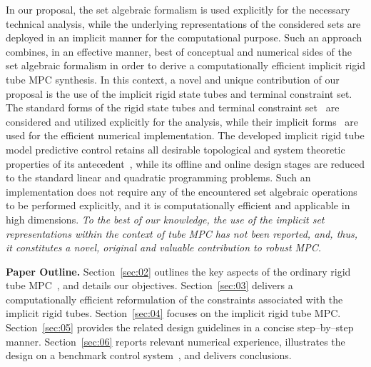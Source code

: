 \documentclass[twocolumn]{autart}
\numberwithin{equation}{section}
\begin{document}
In our proposal, the set algebraic formalism is used explicitly for the necessary technical analysis, while the underlying representations of the considered sets are deployed in an implicit manner for the computational purpose. Such an approach combines, in an effective manner, best of conceptual and  numerical sides of the set algebraic formalism in order to derive a computationally efficient implicit rigid tube MPC synthesis.   In this context, a novel and unique contribution of our proposal is the use of the implicit rigid state tubes and terminal constraint set. The standard forms of the rigid state tubes and terminal constraint set~\cite{mayne:seron:rakovic:2005} are considered and utilized explicitly for the analysis, while their implicit forms~\cite{rakovic:2022,rakovic:zhang:2023:a,rakovic:zhang:2023:b} are used for the efficient numerical implementation.   The developed implicit rigid tube model predictive control retains all desirable topological and system theoretic properties of its antecedent~\cite{mayne:seron:rakovic:2005}, while its offline and online design stages are  reduced to the standard linear and quadratic programming problems. Such an implementation does not require any of the encountered set algebraic operations to be performed explicitly, and it is computationally efficient and applicable in high dimensions. \emph{To the best of our knowledge, the use of the implicit set representations within the context of tube MPC has not been reported, and, thus, it constitutes a novel,  original and valuable contribution to robust MPC.}

\textbf{Paper Outline.} Section~\ref{sec:02} outlines the key aspects of the ordinary rigid tube MPC~\cite{mayne:seron:rakovic:2005}, and details our objectives. Section~\ref{sec:03} delivers a computationally efficient reformulation of the constraints associated with the implicit rigid tubes. Section~\ref{sec:04} focuses on the implicit rigid tube MPC. Section~\ref{sec:05} provides the related design guidelines in a concise step--by--step manner.  Section~\ref{sec:06} reports relevant numerical experience, illustrates the design on a benchmark control system~\cite{leibfritz:2004}, and delivers conclusions. 
\end{document}
